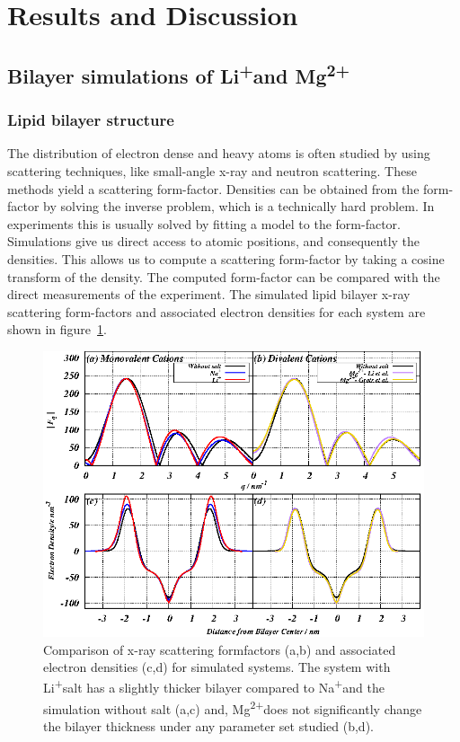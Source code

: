 \documentclass[12pt,openany,final]{book}
\newcommand{\na}{Na\textsuperscript{+}}
\newcommand{\li}{Li\textsuperscript{+}}
\newcommand{\mg}{Mg\textsuperscript{2+}}
\begin{document}
\section{Results and Discussion}
\subsection{Bilayer simulations of \li and \mg}
\subsubsection{Lipid bilayer structure}
The distribution of electron dense and heavy atoms is often studied by using
scattering techniques, like small-angle x-ray and neutron scattering. 
These methods
yield a scattering form-factor.  Densities can be obtained from the form-factor by solving
the inverse problem, which is a technically hard problem. In experiments this is usually solved by fitting a model to the form-factor.
Simulations give us direct access to atomic positions, and consequently
the densities. This allows us to compute a scattering form-factor by taking a cosine transform of the density{. The computed
form-factor}
can be compared with the direct measurements of the experiment.
The simulated lipid bilayer x-ray scattering form-factors and associated 
electron densities for each system are shown in figure~\ref{fig:eledens:ch2}.
\begin{figure}[h!]
    \caption[Formfactors and electron densities]{Comparison of x-ray scattering formfactors (a,b) and associated electron densities (c,d) for simulated systems. 
    {The system with \li salt has a slightly thicker bilayer compared to \na and the simulation without salt (a,c) and},
    \mg does not significantly change the bilayer thickness
    under any parameter set studied (b,d). }
    \label{fig:eledens:ch2}
    \includegraphics[height=0.3\textheight]{Figure_1_ch2.eps}
\end{figure}
\end{document}

